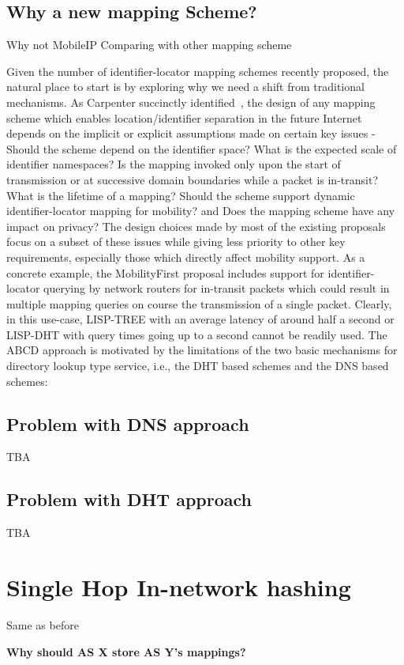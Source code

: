 \subsection{Why a new mapping Scheme? }
Why not MobileIP 
Comparing with other mapping scheme 

Given the number of identifier-locator mapping schemes recently proposed, the natural place to start is by exploring why we need a shift from traditional mechanisms. As Carpenter succinctly identified~\cite{carpenter}, the design of any mapping scheme which enables location/identifier separation in the future Internet depends on the implicit or explicit assumptions made on certain key issues - Should the scheme depend on the identifier space? What is the expected scale of identifier namespaces? Is the mapping invoked only upon the start of transmission or at successive domain boundaries while a packet is in-transit? What is the lifetime of a mapping? Should the scheme support dynamic identifier-locator mapping for mobility? and Does the mapping scheme have any impact on privacy? The design choices made by most of the existing proposals focus on a subset of these issues while giving less priority to other key requirements, especially those which directly affect mobility support. As a concrete example, the MobilityFirst proposal includes support for identifier-locator querying by network routers for in-transit packets which could result in multiple mapping queries on course the transmission of a single packet. Clearly, in this use-case, LISP-TREE with an average latency of around half a second or LISP-DHT with query times going up to a second cannot be readily used. The ABCD approach is motivated by the limitations of the two basic mechanisms for directory lookup type service, i.e., the DHT based schemes and the DNS based schemes:

\subsection{Problem with DNS approach}
TBA
\subsection{Problem with DHT approach}
TBA


\section{Single Hop In-network hashing}
Same as before

{\bf Why should AS X store AS Y's mappings?}





